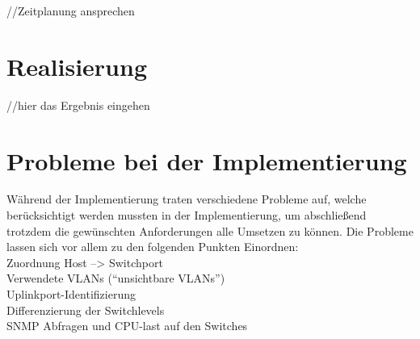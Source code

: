 //Zeitplanung ansprechen

\section{Realisierung}
\label{sec:implementation}

//hier das Ergebnis eingehen

\section{Probleme bei der Implementierung}
\label{sec:probimp}

Während der Implementierung traten verschiedene Probleme auf, welche berücksichtigt werden mussten in der Implementierung, um abschließend trotzdem die gewünschten Anforderungen alle Umsetzen zu können.
Die Probleme lassen sich vor allem zu den folgenden Punkten Einordnen:\\
Zuordnung Host --> Switchport\\
Verwendete VLANs (“unsichtbare VLANs”)\\
Uplinkport-Identifizierung\\
Differenzierung der Switchlevels\\
SNMP Abfragen und CPU-last auf den Switches\\


